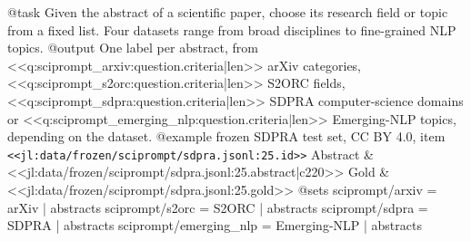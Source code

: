 @task
Given the abstract of a scientific paper, choose its research field or topic from a fixed list. Four datasets range
from broad disciplines to fine-grained NLP topics.
@output
One label per abstract, from <<q:sciprompt_arxiv:question.criteria|len>> arXiv categories,
<<q:sciprompt_s2orc:question.criteria|len>> S2ORC fields, <<q:sciprompt_sdpra:question.criteria|len>>
SDPRA computer-science domains or <<q:sciprompt_emerging_nlp:question.criteria|len>> Emerging-NLP topics, depending on the dataset.
@example frozen SDPRA test set, CC BY 4.0, item \texttt{<<jl:data/frozen/sciprompt/sdpra.jsonl:25.id>>}
Abstract & <<jl:data/frozen/sciprompt/sdpra.jsonl:25.abstract|c220>>
Gold & <<jl:data/frozen/sciprompt/sdpra.jsonl:25.gold>>
@sets
sciprompt/arxiv = arXiv | abstracts
sciprompt/s2orc = S2ORC | abstracts
sciprompt/sdpra = SDPRA | abstracts
sciprompt/emerging_nlp = Emerging-NLP | abstracts
